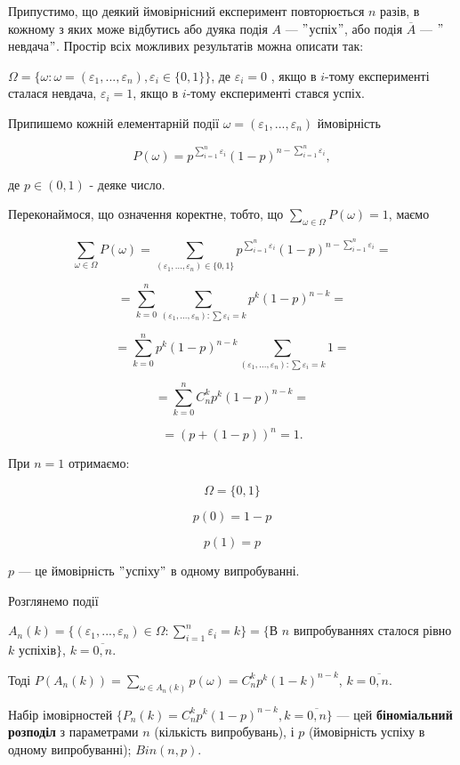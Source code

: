 Припустимо, що деякий ймовірнісний експеримент повторюється $n$ разів, в
кожному з яких може відбутись або дуяка подія $A$ --- $"$успіх$"$, або подія
$\overline{A}$ --- $"$невдача$"$. Простір всіх можливих результатів можна
описати так:

$\Omega = \{\omega: \omega = (\varepsilon_1, ..., \varepsilon_n), \varepsilon_i \in \{0, 1\}\}$, 
де $\varepsilon_i = 0$ , якщо в $i$-тому експерименті сталася невдача, $\varepsilon_i = 1$, якщо
в $i$-тому експерименті стався успіх.

Припишемо кожній елементарній події $\omega = (\varepsilon_1, ..., \varepsilon_n)$ ймовірність

$$P(\omega) = p^{\sum\limits_{i=1}^n \varepsilon_i} (1-p)^{n - \sum\limits_{i=1}^n \varepsilon_i},$$

де $p \in (0, 1)$ - деяке число.

Переконаймося, що означення коректне, тобто, що $\sum\limits_{\omega \in \Omega} P(\omega) = 1$, маємо

$$\sum\limits_{\omega \in \Omega} P(\omega)
= \sum\limits_{(\varepsilon_1, ..., \varepsilon_n) \in \{0, 1\}}
    p^{\sum\limits_{i=1}^n \varepsilon_i}
    (1-p)^{n - \sum\limits_{i=1}^n \varepsilon_i} =$$

$$= \sum\limits_{k=0}^n \sum\limits_{(\varepsilon_1, ..., \varepsilon_n) : \sum \varepsilon_i = k}
    p^k (1-p)^{n-k} = $$

$$= \sum\limits_{k=0}^n p^k (1-p)^{n-k} \sum\limits_{(\varepsilon_1, ..., \varepsilon_n) : \sum \varepsilon_i = k} 1 =$$

$$= \sum\limits_{k=0}^n C_n^kp^k(1-p)^{n-k} =$$

$$= (p+(1-p))^n = 1.$$

При $n=1$ отримаємо:

$$\Omega = \{0, 1\}$$

$$p(0) = 1-p$$

$$p(1) = p$$

$p$ --- це ймовірність $"$успіху$"$ в одному випробуванні.

Розглянемо події

$A_n(k) = \{(\varepsilon_1, ..., \varepsilon_n) \in \Omega: \sum\limits_{i=1}^n \varepsilon_i = k\}
= \{$В $n$ випробуваннях сталося рівно $k$ успіхів$\}$, $k = \overline{0,n}$.

Тоді $P(A_n(k)) = \sum\limits_{\omega \in A_n(k)} p(\omega) = C_n^k p^k (1-k)^{n-k}$,
$k = \overline{0, n}$.

\begin{definition}
    Набір імовірностей $\{P_n(k) = C_n^kp^k(1-p)^{n-k}, k = \overline{0, n}\}$ --- цей
    \textbf{біноміальний розподіл} з параметрами $n$ (кількість випробувань), і  $p$
    (ймовірність успіху в одному випробуванні); $Bin(n,p)$.
\end{definition}


